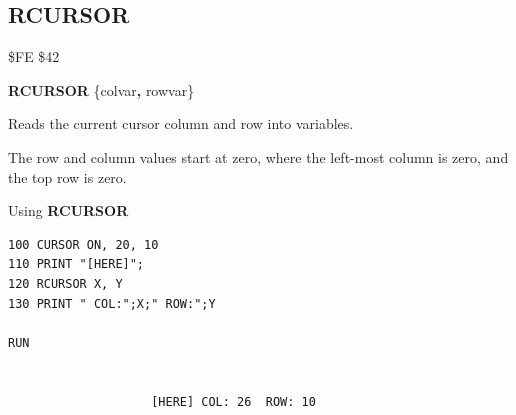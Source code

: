 
\newpage
\subsection{RCURSOR}
\begin{description}[leftmargin=2cm,style=nextline]
\item [Token:]    \$FE \$42

\item [Format:]   {\bf RCURSOR} \{colvar{\bf,} rowvar\}

\item [Usage:]    Reads the current cursor column and row into variables.

\item [Remarks:]  The row and column values start at zero, where the left-most column is zero, and the top row is zero.

\item [Example:]  Using {\bf RCURSOR}

\begin{tcolorbox}[colback=black,coltext=white]
\verbatimfont{\codefont}
\begin{verbatim}
100 CURSOR ON, 20, 10
110 PRINT "[HERE]";
120 RCURSOR X, Y
130 PRINT " COL:";X;" ROW:";Y

RUN


                    [HERE] COL: 26  ROW: 10
\end{verbatim}
\end{tcolorbox}
\end{description}


\newpage
